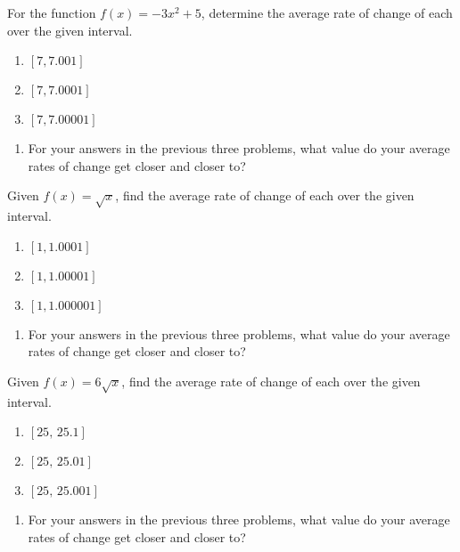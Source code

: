 For the function $f(x) = -3x^2 + 5$, determine the average rate of change of each over the given interval.
\begin{enumerate}
\setcounter{enumi}{\value{Review}}
    \item $[7, 7.001]$
    \item $[7, 7.0001]$
    \item $[7, 7.00001]$
\setcounter{Review}{\value{enumi}}
\end{enumerate}

\begin{enumerate}
\setcounter{enumi}{\value{Review}}
\item For your answers in the previous three problems, what value do your average rates of change get closer and closer to?
\setcounter{Review}{\value{enumi}}
\end{enumerate}

Given $f(x) = \sqrt{x}$, find the average rate of change of each over the given interval.
\begin{enumerate}
\setcounter{enumi}{\value{Review}}
	\item $[1, 1.0001]$
	\item $[1, 1.00001]$
	\item $[1, 1.000001]$
\setcounter{Review}{\value{enumi}}
\end{enumerate}

\begin{enumerate}
\setcounter{enumi}{\value{Review}}
\item For your answers in the previous three problems, what value do your average rates of change get closer and closer to?
\setcounter{Review}{\value{enumi}}
\end{enumerate}


Given $f(x) = 6\sqrt{x}$, find the average rate of change of each over the given interval.
\begin{enumerate}
\setcounter{enumi}{\value{Review}}
	\item $[25,\, 25.1]$
	\item $[25, \, 25.01]$
	\item $[25, \, 25.001]$
\setcounter{Review}{\value{enumi}}
\end{enumerate}

\begin{enumerate}
\setcounter{enumi}{\value{Review}}
\item For your answers in the previous three problems, what value do your average rates of change get closer and closer to?
\setcounter{Review}{\value{enumi}}
\end{enumerate}

